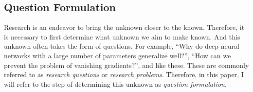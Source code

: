 \documentclass{book}
\begin{document}






\subsection{Question Formulation}
Research is an endeavor to bring the unknown closer to the known. Therefore, it is necessary to first determine what unknown we aim to make known. And this unknown often takes the form of questions. For example, ``Why do deep neural networks with a large number of parameters generalize well?'', ``How can we prevent the problem of vanishing gradients?'', and like these. These are commonly referred to as \textit{research questions} or \textit{research problems}. Therefore, in this paper, I will refer to the step of determining this unknown as \textit{question formulation}.
\end{document}
